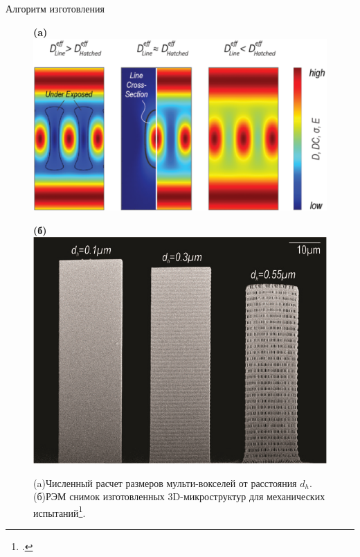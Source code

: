 \documentclass[aspectratio=169]{beamer}
\begin{document}
\begin{frame}{Алгоритм изготовления}
            \begin{figure}
                \begin{minipage}[t]{0.45\linewidth}
                    \textbf{(a)} \\ 
                    \includegraphics[height = 0.5\paperheight]{fig/2022-05-13_10-57-53.png}
                \end{minipage}
                \hfill
                \begin{minipage}[t]{0.45\linewidth}
                    \textbf{(б)} \\ 
                    \includegraphics[height = 0.5\paperheight]{fig/d_h.png}
                \end{minipage}
                    \caption*{(a)Численный расчет размеров мульти-вокселей от расстояния $d_h$. (б)РЭМ снимок изготовленных 3D-микроструктур для механических испытаний\footcite{Mechrambald}.}
                    \label{fig:vox_dose_d_h}
            \end{figure}

\end{frame}
\end{document}
